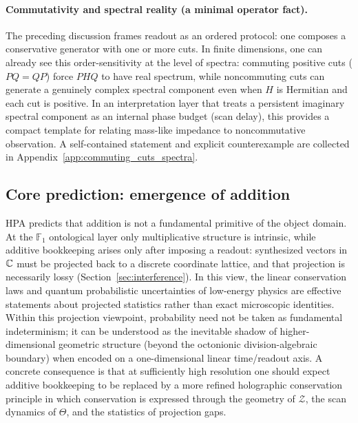 \paragraph{Commutativity and spectral reality (a minimal operator fact).}
The preceding discussion frames readout as an ordered protocol: one composes a conservative generator with one or more cuts. In finite dimensions, one can already see this order-sensitivity at the level of spectra: commuting positive cuts ($PQ=QP$) force $PHQ$ to have real spectrum, while noncommuting cuts can generate a genuinely complex spectral component even when $H$ is Hermitian and each cut is positive. In an interpretation layer that treats a persistent imaginary spectral component as an internal phase budget (scan delay), this provides a compact template for relating mass-like impedance to noncommutative observation. A self-contained statement and explicit counterexample are collected in Appendix~\ref{app:commuting_cuts_spectra}.

\subsection{Core prediction: emergence of addition}
HPA predicts that addition is not a fundamental primitive of the object domain. At the $\mathbb{F}_1$ ontological layer only multiplicative structure is intrinsic, while additive bookkeeping arises only after imposing a readout: synthesized vectors in $\mathbb{C}$ must be projected back to a discrete coordinate lattice, and that projection is necessarily lossy (Section~\ref{sec:interference}). In this view, the linear conservation laws and quantum probabilistic uncertainties of low-energy physics are effective statements about projected statistics rather than exact microscopic identities. Within this projection viewpoint, probability need not be taken as fundamental indeterminism; it can be understood as the inevitable shadow of higher-dimensional geometric structure (beyond the octonionic division-algebraic boundary) when encoded on a one-dimensional linear time/readout axis. A concrete consequence is that at sufficiently high resolution one should expect additive bookkeeping to be replaced by a more refined holographic conservation principle in which conservation is expressed through the geometry of $\mathcal{Z}$, the scan dynamics of $\Theta$, and the statistics of projection gaps.


